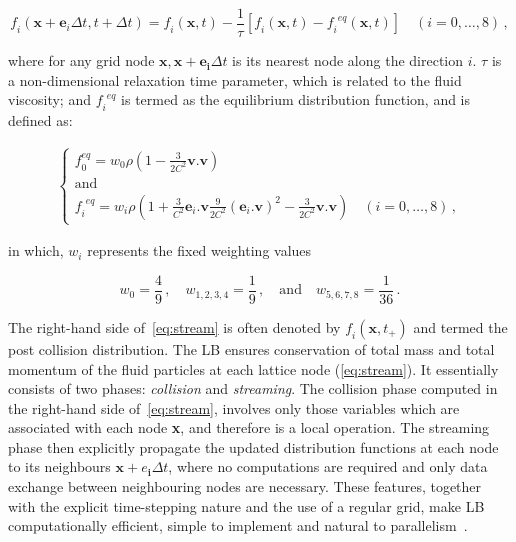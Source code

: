 \begin{equation} 
	\label{eq:stream}
	\mathit{f_i}(\mathbf{x}+\mathbf{e}_{\mathit{i}} \Delta t, t + \Delta t) = 
	\mathit{f_i}(\mathbf{x},t) - \frac{1}{\tau} [\mathit{f_i}(\mathbf{x},t) 
	-\mathit{f_i}^{\mathit{eq}}(\mathbf{x},t)] \quad (\mathit{i}=0,\dots,8) \,,
\end{equation}

\noindent where for any grid node $\mathbf{x},\mathbf{x}+\mathbf{e_i} \Delta t$ 
is its nearest node along the direction $\mathit{i}$. $\tau$ is a 
non-dimensional relaxation time parameter, which is related to the fluid 
viscosity; and $\mathit{f_i}^{\mathit{eq}}$ is termed as the equilibrium 
distribution function, and is defined as:

\begin{align}
	\begin{cases}
	\mathit{f}_{\mathit{0}}^{\mathit{eq}} = \mathit{w}_{\mathit{0}} \rho (1 - 
	\frac{3}{2\mathit{C}^{\mathit{2}}}\mathbf{v}.\mathbf{v}) \\ 
	\mbox{and}\\
	\mathit{f_i}^{\mathit{eq}} = \mathit{w_i} \rho (1 + 
	\frac{3}{\mathit{C}^{\mathit{2}}}\mathbf{e}_{\mathit{i}}.\mathbf{v} 
	\frac{9}{2\mathit{C}^{\mathit{2}}} 
	(\mathbf{e}_{\mathit{i}}.\mathbf{v})^{\mathit{2}}-\frac{3}{2 
	\mathit{C}^{\mathit{2}}}\mathbf{v}.\mathbf{v}) \quad 
	(\mathit{i}=0,\dots,8)\,,
	\end{cases}
\end{align}

\noindent in which, $\mathit{w_i}$ represents the fixed weighting values

\begin{equation}
	\mathit{w}_{\mathit{0}} = \frac{4}{9}\,, \quad 
	\mathit{w}_{\mathit{1,2,3,4}}= 
	\frac{1}{9}\,, \quad \mbox{and} \quad \mathit{w}_{\mathit{5,6,7,8}}= 
	\frac{1}{36}\,.
\end{equation}

The right-hand side of~\cref{eq:stream} is often denoted by 
$\mathit{f_i}(\mathbf{x}, \mathit{t}_{+})$ and termed the post collision 
distribution. The LB ensures conservation of total mass and total momentum of 
the fluid particles at each lattice node (\cref{eq:stream}). It essentially 
consists of two phases: \textit{collision} and \textit{streaming}. The 
collision phase computed in the right-hand side of~\cref{eq:stream}, involves 
only those variables which are associated with each node \textbf{x}, and 
therefore is a local operation. The streaming phase then explicitly propagate 
the updated distribution functions at each node to its neighbours 
$\mathbf{x}+\mathbf{\mathit{e}_i} \Delta t$, where no computations are required 
and only data exchange between neighbouring nodes are necessary. These 
features, together with the explicit time-stepping nature and the use of a 
regular grid, make LB computationally efficient, simple to implement and 
natural to parallelism~\citep{Han2007}. 

